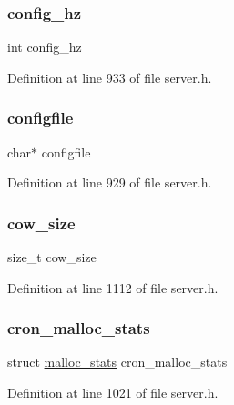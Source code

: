 \subsubsection{\texorpdfstring{config\+\_\+hz}{config\_hz}}
{\footnotesize\ttfamily int config\+\_\+hz}



Definition at line 933 of file server.\+h.

\mbox{\label{structredis_server_a761e2c812e0a5ab3b7afcbb2586d4012}} 
\subsubsection{\texorpdfstring{configfile}{configfile}}
{\footnotesize\ttfamily char$\ast$ configfile}



Definition at line 929 of file server.\+h.

\mbox{\label{structredis_server_abf5f3ab99224e13f1b05690ba42216ca}} 
\subsubsection{\texorpdfstring{cow\+\_\+size}{cow\_size}}
{\footnotesize\ttfamily size\+\_\+t cow\+\_\+size}



Definition at line 1112 of file server.\+h.

\mbox{\label{structredis_server_ac781bc597dbf0ec72337e6c648a55817}} 
\subsubsection{\texorpdfstring{cron\+\_\+malloc\+\_\+stats}{cron\_malloc\_stats}}
{\footnotesize\ttfamily struct \hyperlink{structmalloc__stats}{malloc\+\_\+stats} cron\+\_\+malloc\+\_\+stats}



Definition at line 1021 of file server.\+h.

